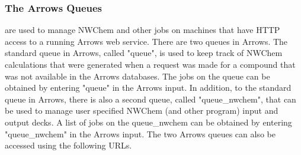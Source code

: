 \documentclass[runningheads,a4paper]{llncs}
\begin{document}
\subsubsection{The Arrows Queues} are used to manage NWChem and other jobs on machines that have HTTP access to a running Arrows web service.  
There are two queues in Arrows.  The standard queue in Arrows, called "queue", is used to keep track of NWChem calculations that were generated when a request was made for a compound that was not available in the Arrows databases.  The jobs on the queue can be obtained by entering "queue" in the Arrows input.  In addition, to the standard queue in Arrows, there is also a second queue, called "queue\_nwchem", that can be used to manage user specified NWChem (and other program) input and output decks. A list of jobs on the queue\_nwchem can be obtained by entering "queue\_nwchem" in the Arrows input. The two Arrows queues can also be accessed using the following URLs.

\noindent{}
\end{document}
